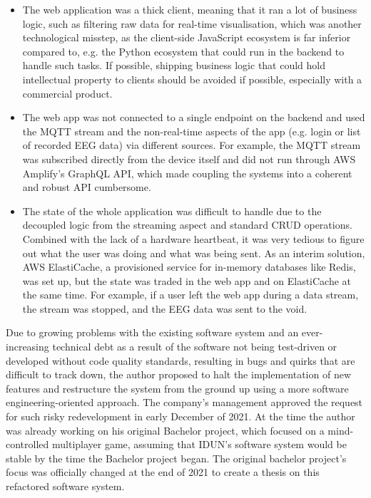 \begin{itemize}
\item The web application was a thick client, meaning that it ran a lot of business logic, such as filtering raw data for real-time visualisation, which was another technological misstep, as the client-side JavaScript ecosystem is far inferior compared to, e.g. the Python ecosystem that could run in the backend to handle such tasks. If possible, shipping business logic that could hold intellectual property to clients should be avoided if possible, especially with a commercial product.
\item The web app was not connected to a single endpoint on the backend and used the MQTT stream and the non-real-time aspects of the app (e.g. login or list of recorded EEG data) via different sources. For example, the MQTT stream was subscribed directly from the device itself and did not run through AWS Amplify's GraphQL API, which made coupling the systems into a coherent and robust API cumbersome.
\item The state of the whole application was difficult to handle due to the decoupled logic from the streaming aspect and standard CRUD operations. Combined with the lack of a hardware heartbeat, it was very tedious to figure out what the user was doing and what was being sent. As an interim solution, AWS ElastiCache, a provisioned service for in-memory databases like Redis, was set up, but the state was traded in the web app and on ElastiCache at the same time. For example, if a user left the web app during a data stream, the stream was stopped, and the EEG data was sent to the void.
\end{itemize}

Due to growing problems with the existing software system and an ever-increasing technical debt as a result of the software not being test-driven or developed without code quality standards, resulting in bugs and quirks that are difficult to track down, the author proposed to halt the implementation of new features and restructure the system from the ground up using a more software engineering-oriented approach. The company's management approved the request for such risky redevelopment in early December of 2021. At the time the author was already working on his original Bachelor project, which focused on a mind-controlled multiplayer game, assuming that IDUN's software system would be stable by the time the Bachelor project began. The original bachelor project's focus was officially changed at the end of 2021 to create a thesis on this refactored software system.

